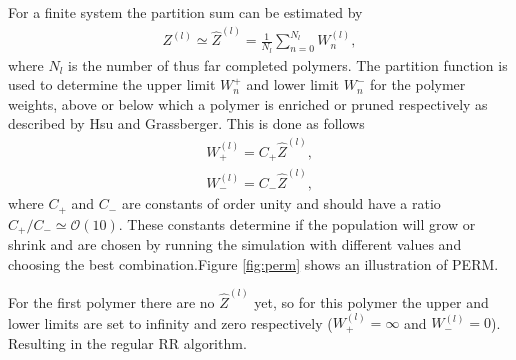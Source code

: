 For a finite system the partition sum can be estimated\cite{hsu2011review} by 
\begin{gather*}
    Z^{(l)} \simeq \hat{Z}^{(l)}
    = \frac{1}{N_l} \sum_{n=0}^{N_l}W_n^{(l)},
\end{gather*} where $N_l$ is the number of thus far completed polymers. The partition function is used to determine the upper limit $W_n^+$ and lower limit $W_n^-$ for the polymer weights, above or below which a polymer is enriched or pruned respectively as described by Hsu and Grassberger\cite{hsu2011review}. This is done as follows
\begin{gather*}
    W_+^{(l)} = C_+\hat{Z}^{(l)},\\
    W_-^{(l)} = C_-\hat{Z}^{(l)},
\end{gather*} where $C_+$ and $C_-$ are constants of order unity and should have a ratio $C_+/C_- \simeq \mathcal{O}(10)$. These constants determine if the population will grow or shrink and are chosen by running the simulation with different values and choosing the best combination.Figure \ref{fig:perm} shows an illustration of PERM.

For the first polymer there are no $\hat{Z}^{(l)}$ yet, so for this polymer the upper and lower limits are set to infinity and zero respectively ($ W_+^{(l)}= \infty$ and $W_-^{(l)}=0$). Resulting in the regular RR algorithm.

